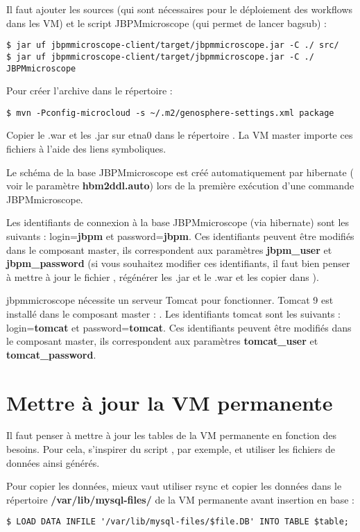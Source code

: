 Il faut ajouter les sources (qui sont nécessaires pour le déploiement des workflows dans les VM) et le script JBPMmicroscope (qui permet de lancer bagsub) :
\begin{lstlisting}[style=bash]
$ jar uf jbpmmicroscope-client/target/jbpmmicroscope.jar -C ./ src/
$ jar uf jbpmmicroscope-client/target/jbpmmicroscope.jar -C ./ JBPMmicroscope
\end{lstlisting}
\bigskip

Pour créer l'archive  dans le répertoire  :
\begin{lstlisting}[style=bash]
$ mvn -Pconfig-microcloud -s ~/.m2/genosphere-settings.xml package
\end{lstlisting}
\bigskip

Copier le .war et les .jar sur etna0 dans le répertoire .
La VM master importe ces fichiers à l’aide des liens symboliques.
\newline

Le schéma de la base JBPMmicroscope est créé automatiquement par hibernate ( voir le paramètre \textbf{hbm2ddl.auto}) lors de la première exécution d'une commande JBPMmicroscope.
\newline

Les identifiants de connexion à la base JBPMmicroscope (via hibernate) sont les suivants :
login=\textbf{jbpm} et password=\textbf{jbpm}. Ces identifiants peuvent être modifiés dans le composant master, ils correspondent aux paramètres \textbf{jbpm\_user} et \textbf{jbpm\_password} (si vous souhaitez modifier ces identifiants, il faut bien penser à mettre à jour le fichier , régénérer les .jar et le .war et les copier dans ).
\newline

jbpmmicroscope nécessite un serveur Tomcat pour fonctionner. Tomcat 9 est installé dans le composant master : . Les identifiants tomcat sont les suivants : login=\textbf{tomcat} et password=\textbf{tomcat}.
Ces identifiants peuvent être modifiés dans le composant master, ils correspondent aux paramètres \textbf{tomcat\_user} et \textbf{tomcat\_password}.

\section{Mettre à jour la VM permanente}

Il faut penser à mettre à jour les tables de la VM permanente en fonction des besoins. Pour cela, s'inspirer du script , par exemple, et utiliser les fichiers de données ainsi générés.
\bigskip

Pour copier les données, mieux vaut utiliser rsync et copier les données dans le répertoire \textbf{/var/lib/mysql-files/} de la VM permanente avant insertion en base :
\begin{lstlisting}[style=bash]
$ LOAD DATA INFILE '/var/lib/mysql-files/$file.DB' INTO TABLE $table;
\end{lstlisting}
